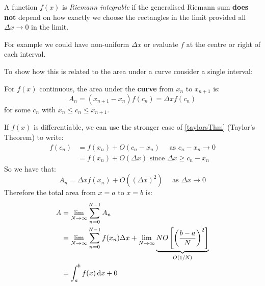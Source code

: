 \documentclass[../main.tex]{subfiles}
\begin{document}
\begin{definition}
  A function $f(x)$ is \textit{Riemann integrable} if the generalised Riemann sum \textbf{does not} depend on how exactly we choose the rectangles in the limit provided all $\Delta x \to 0$ in the limit.

  For example we could have non-uniform $\Delta x$ or evaluate $f$ at the centre or right of each interval.
\end{definition}
To show how this is related to the area under a curve consider a single interval:
\begin{center}
\end{center}
\begin{theorem}
  For $f(x)$ continuous, the area under the \textbf{curve} from $x_n$ to $x_{n + 1}$ is:
  \[
    A_n = (x_{n+1}-x_n)f(c_n) = \Delta x f(c_n)
    \label{meanValue}
  \]
  for some $c_n$ with $x_n \leq c_n \leq x_{n+1}$.
\end{theorem}
If $f(x)$ is differentiable, we can use the stronger case of \cref{taylorsThm} (Taylor's Theorem) to write:
\begin{align*}
  f(c_n) &= f(x_n) + O(c_n - x_n) \quad \text{ as } c_n - x_n \to 0 \\
         &= f(x_n) + O(\Delta x) \text{ since $\Delta x \geq c_n - x_n$}
\end{align*}
So we have that:
\[
  A_n = \Delta x f(x_n) + O((\Delta x)^2) \quad \text{ as } \Delta x \to 0
\]
Therefore the total area from $x=a$ to $x=b$ is:
\begin{align*}
  A &= \lim_{N \to \infty} \sum_{n=0}^{N-1} A_n \\
    &= \lim_{N \to \infty} \sum_{n=0}^{N-1} f(x_n) \Delta x + \lim_{N \to \infty} \underbrace{NO\left[\left(\frac{b-a}{N}\right)^2\right]}_{O(1/N)} \\
    &= \int_{a}^{b} f(x) \,\mathrm{d} x + 0
\end{align*}
\end{document}
